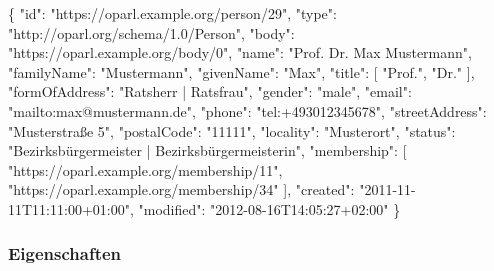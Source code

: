 \documentclass[,a4paper]{article}
\newenvironment{Shaded}{}{}
\newcommand{\DataTypeTok}[1]{\textcolor[rgb]{0.56,0.13,0.00}{{#1}}}
\newcommand{\StringTok}[1]{\textcolor[rgb]{0.25,0.44,0.63}{{#1}}}
\newcommand{\OtherTok}[1]{\textcolor[rgb]{0.00,0.44,0.13}{{#1}}}
\newcommand{\FunctionTok}[1]{\textcolor[rgb]{0.02,0.16,0.49}{{#1}}}
\begin{document}
\begin{Shaded}
\begin{Highlighting}[]
\FunctionTok{\{}
    \DataTypeTok{"id"}\FunctionTok{:} \StringTok{"https://oparl.example.org/person/29"}\FunctionTok{,}
    \DataTypeTok{"type"}\FunctionTok{:} \StringTok{"http://oparl.org/schema/1.0/Person"}\FunctionTok{,}
    \DataTypeTok{"body"}\FunctionTok{:} \StringTok{"https://oparl.example.org/body/0"}\FunctionTok{,}
    \DataTypeTok{"name"}\FunctionTok{:} \StringTok{"Prof. Dr. Max Mustermann"}\FunctionTok{,}
    \DataTypeTok{"familyName"}\FunctionTok{:} \StringTok{"Mustermann"}\FunctionTok{,}
    \DataTypeTok{"givenName"}\FunctionTok{:} \StringTok{"Max"}\FunctionTok{,}
    \DataTypeTok{"title"}\FunctionTok{:} \OtherTok{[}
        \StringTok{"Prof."}\OtherTok{,}
        \StringTok{"Dr."}
    \OtherTok{]}\FunctionTok{,}
    \DataTypeTok{"formOfAddress"}\FunctionTok{:} \StringTok{"Ratsherr | Ratsfrau"}\FunctionTok{,}
    \DataTypeTok{"gender"}\FunctionTok{:} \StringTok{"male"}\FunctionTok{,}
    \DataTypeTok{"email"}\FunctionTok{:} \StringTok{"mailto:max@mustermann.de"}\FunctionTok{,}
    \DataTypeTok{"phone"}\FunctionTok{:} \StringTok{"tel:+493012345678"}\FunctionTok{,}
    \DataTypeTok{"streetAddress"}\FunctionTok{:} \StringTok{"Musterstraße 5"}\FunctionTok{,}
    \DataTypeTok{"postalCode"}\FunctionTok{:} \StringTok{"11111"}\FunctionTok{,}
    \DataTypeTok{"locality"}\FunctionTok{:} \StringTok{"Musterort"}\FunctionTok{,}
    \DataTypeTok{"status"}\FunctionTok{:} \StringTok{"Bezirksbürgermeister | Bezirksbürgermeisterin"}\FunctionTok{,}
    \DataTypeTok{"membership"}\FunctionTok{:} \OtherTok{[}
        \StringTok{"https://oparl.example.org/membership/11"}\OtherTok{,}
        \StringTok{"https://oparl.example.org/membership/34"}
    \OtherTok{]}\FunctionTok{,}
    \DataTypeTok{"created"}\FunctionTok{:} \StringTok{"2011-11-11T11:11:00+01:00"}\FunctionTok{,}
    \DataTypeTok{"modified"}\FunctionTok{:} \StringTok{"2012-08-16T14:05:27+02:00"}
\FunctionTok{\}}
\end{Highlighting}
\end{Shaded}

\subsubsection{Eigenschaften}\label{eigenschaften-3}
\end{document}
